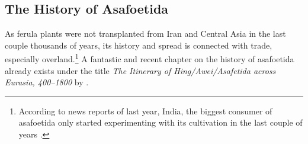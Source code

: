 





\subsection{The History of Asafoetida}

As ferula plants were not transplanted from Iran and Central Asia in the last couple thousands of years, its history and spread is connected with trade, especially overland.\footnote{According to news reports of last year, India, the biggest consumer of asafoetida only started experimenting with its cultivation in the last couple of years \autocite{express_news_service_taking_2021}.}   
A fantastic and recent chapter on the history of asafoetida already exists under the title \textit{The Itinerary of Hing/Awei/Asafetida
across Eurasia, 400--1800} by \textcite{leung_itinerary_2019}.


